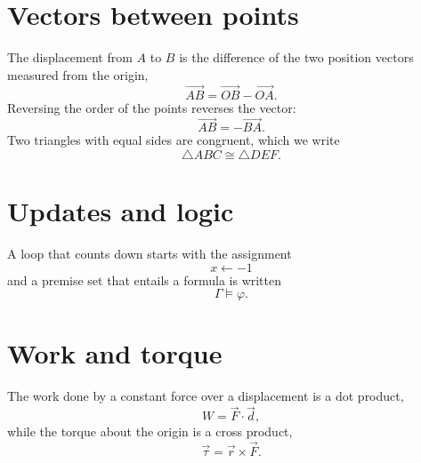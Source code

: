 \documentclass[11pt]{article}
\begin{document}
\section*{Vectors between points}

The displacement from $A$ to $B$ is the difference of the two position vectors
measured from the origin,
\[
  \overrightarrow{AB} = \overrightarrow{OB} - \overrightarrow{OA}.
\]
Reversing the order of the points reverses the vector:
\[
  \overrightarrow{AB} = -\overrightarrow{BA}.
\]
Two triangles with equal sides are congruent, which we write
\[
  \triangle ABC \cong \triangle DEF.
\]

\section*{Updates and logic}

A loop that counts down starts with the assignment
\[
  x \gets -1
\]
and a premise set that entails a formula is written
\[
  \Gamma \models \varphi.
\]

\section*{Work and torque}

The work done by a constant force over a displacement is a dot product,
\[
  W = \vec{F} \cdot \vec{d},
\]
while the torque about the origin is a cross product,
\[
  \vec{\tau} = \vec{r} \times \vec{F}.
\]
\end{document}
